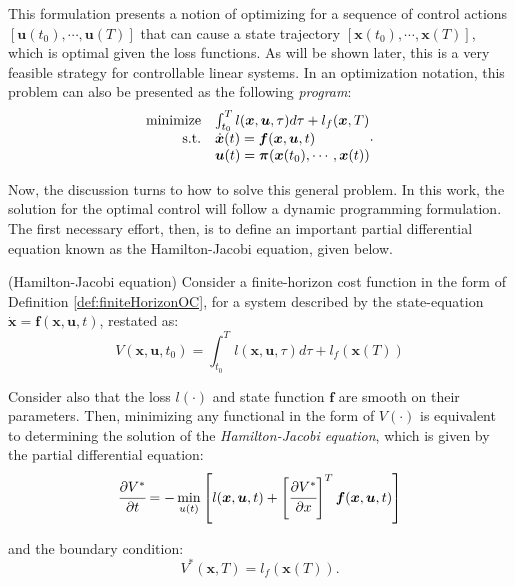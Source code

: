 \documentclass[a4paper,11pt]{book}
\numberwithin{figure}{chapter}
\numberwithin{equation}{chapter}
\numberwithin{table}{chapter}
\newtheorem{theorem}{Theorem}[chapter]
\theoremstyle{definition}
\newcounter{boxed-theorem}
\newenvironment{boxed-theorem}[1]
{\colorlet{shadecolor}{pastelBlue2!5} \begin{shaded} \begin{theorem}{#1}}
{\end{theorem} \end{shaded}}
\newcounter{boxed-lemma}
\newcounter{boxed-definition}
\newcounter{boxed-example}
\begin{document}
This formulation presents a notion of optimizing for a sequence of control actions $[\bm{u}(t_0), \cdots, \bm{u}(T)]$ that can cause a state trajectory $[\bm{x}(t_0), \cdots, \bm{x}(T)]$, which is optimal given the loss functions. As will be shown later, this is a very feasible strategy for controllable linear systems. In an optimization notation, this problem can also be presented as the following \textit{program}: 
\begin{align}
\begin{matrix*}[l]
    \text{minimize} & \int_{t_0}^T l(\bm{x}, \bm{u}, \tau) d \tau + l_f(\bm{x}, T) \\
    \hfill \text{s.t.} & \dot{\bm{x}}(t) = \bm{f}(\bm{x}, \bm{u}, t)  \\
                & \bm{u}(t) = \bm{\pi}(\bm{x}(t_0), \cdots, \bm{x}(t))
\end{matrix*}
.\end{align}

Now, the discussion turns to how to solve this general problem. In this work, the solution for the optimal control will follow a dynamic programming formulation. The first necessary effort, then, is to define an important partial differential equation known as the Hamilton-Jacobi equation, given below.

\begin{boxed-theorem}{(Hamilton-Jacobi equation)} \label{th:hamiltonJacobi}
    Consider a finite-horizon cost function in the form of Definition \ref{def:finiteHorizonOC}, for a system described by the state-equation $\dot{\bm{x}} = \bm{f}(\bm{x}, \bm{u}, t)$, restated as:
    \begin{equation} \label{eq:valueCostFunctional}
    	V(\bm{x}, \bm{u}, t_0) = \int_{t_0}^T l(\bm{x}, \bm{u}, \tau) d \tau + l_f(\bm{x}(T))
    \end{equation}
    
    \noindent Consider also that the loss $l(\cdot)$ and state function $\bm{f}$ are smooth on their parameters. Then, minimizing any functional in the form of $V(\cdot)$ is equivalent to determining the solution of the \textit{Hamilton-Jacobi equation}, which is given by the partial differential equation:
    \begin{equation} \label{eq:HJEquation}
        \cfrac{\partial V^*}{\partial t} = - \min_{u(t)} \left[ l(\bm{x}, \bm{u}, t) + \left[ \cfrac{\partial V^*}{\partial x} \right]^T \bm{f}(\bm{x}, \bm{u}, t)  \right]
    \end{equation}
    
    \noindent and the boundary condition:
    \begin{equation}
        V^*(\bm{x}, T) = l_f(\bm{x}(T))
    .\end{equation}
\end{boxed-theorem}
\end{document}
